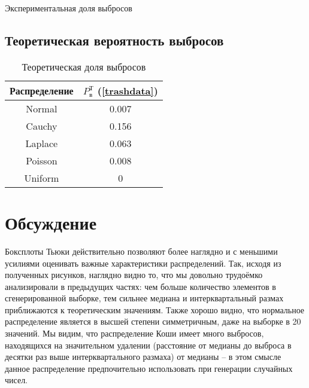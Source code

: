 \begin{table}[H]
	\begin{center}
		
		\caption{Экспериментальная доля выбросов}
		\label{tabl:tabl_name}
	\end{center}
\end{table}


\subsection{Теоретическая вероятность выбросов}

\begin{table}[H]
	\begin{center}
		\begin{tabular}{|c|c|}
			\hline			
			Распределение & $P_{\text{в}}^{\text{Т}}$ (\ref{trashdata})
			\\
			\hline			
			Normal & 0.007 \\
			\hline
			Cauchy & 0.156 \\
			\hline
			Laplace & 0.063 \\
			\hline			
			Poisson & 0.008 \\
			\hline		
			Uniform & 0 \\
			\hline			
		\end{tabular}
		\caption{Теоретическая доля выбросов}
		\label{tabl:tabl_name}
	\end{center}
\end{table}

\section{Обсуждение}

Боксплоты Тьюки действительно позволяют более наглядно и с меньшими усилиями оценивать важные характеристики распределений. Так, исходя из полученных рисунков, наглядно видно то, что мы довольно трудоёмко анализировали в предыдущих частях: чем больше количество элементов в сгенерированной выборке, тем сильнее медиана и интерквартальный размах приближаются к теоретическим значениям. Также хорошо видно, что нормальное распределение является в высшей степени симметричным, даже на выборке в 20 значений. Мы видим, что распределение Коши имеет много выбросов, находящихся на значительном удалении (расстояние от медианы до выброса в десятки раз выше интерквартального размаха) от медианы -- в этом смысле данное распределение предпочительно использовать при генерации случайных чисел.

